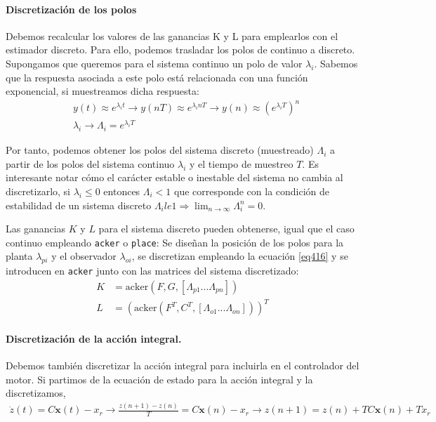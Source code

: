 \documentclass[10pt,a4paper]{report}
\begin{document}
\paragraph{Discretización de los polos} Debemos recalcular los valores de las ganancias K y L para emplearlos con el estimador discreto. Para ello, podemos trasladar los polos de continuo a discreto. Supongamos que queremos para el sistema continuo un polo de valor $\lambda_i$. Sabemos que la respuesta asociada a este polo está relacionada con una función exponencial, si muestreamos dicha respuesta:
\begin{align}
&y(t) \approx e^{\lambda_it} \rightarrow y(nT) \approx e^{\lambda_inT} \rightarrow y(n) \approx \left(e^{\lambda_iT}\right)^n\\
&\lambda_i \rightarrow  \Lambda_i = e^{\lambda_iT} \label{eq416}
\end{align}

Por tanto, podemos obtener los polos del sistema discreto (muestreado) $\Lambda_i$ a partir de los polos del sistema continuo $\lambda_i$ y el tiempo de muestreo $T$. Es interesante notar cómo el carácter estable o inestable del sistema no cambia al discretizarlo, si $\lambda_i \le 0$ entonces $\Lambda_i < 1$ que corresponde con la condición de estabilidad de un sistema discreto $\Lambda_i le 1 \Rightarrow  \lim_{n\rightarrow \infty} \Lambda_i^n =0$.

Las ganancias $K$ y $L$ para el sistema discreto pueden obtenerse, igual que el caso continuo empleando \texttt{acker} o \texttt{place}: Se diseñan la posición de los polos para la planta $\lambda_{pi}$ y el observador $\lambda_{oi}$, se discretizan empleando la ecuación \ref{eq416} y se introducen en \texttt{acker} junto con las matrices del sistema discretizado:
\begin{align*}
K &= \text{acker}(F,G,[\Lambda_{p1}...\Lambda_{pn}])\\
L &= \left(\text{acker}(F^T,C^T,[\Lambda_{o1}...\Lambda_{on}])\right)^T
\end{align*}

\paragraph{Discretización de la acción integral.} Debemos también discretizar la acción integral para incluirla en el controlador del motor. Si partimos de la ecuación de estado para la acción integral y la discretizamos,
\begin{align*}
\dot{z}(t) = C \mathbf{x}(t) - x_r \rightarrow \frac{z(n+1)-z(n)}{T}= C \mathbf{x}(n) - x_r \rightarrow z(n+1) = z(n) +TC  \mathbf{x}(n) +Tx_r
\end{align*}
\end{document}
